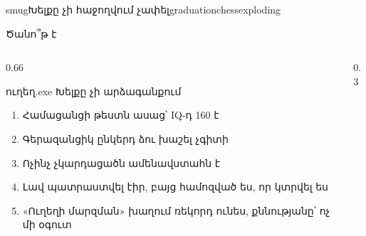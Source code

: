 
%
  {    }%
  {smug}{Խելքը չի հաջողվում չափել}{{graduation}{chess}{exploding}}

\begin{frame}{Ծանո՞թ է}
  \begin{columns}[c]
    \begin{column}{0.66\textwidth}
      \begin{popup}{ուղեղ.exe}
        {\blackfont Խելքը չի արձագանքում}\par\smallskip
        \begin{enumerate}\small
          \item<2-> Համացանցի թեստն ասաց՝ IQ-դ 160 է
          \item<3-> Գերազանցիկ ընկերդ ձու խաշել չգիտի
          \item<4-> Ոչինչ չկարդացածն ամենավստահն է
          \item<5-> Լավ պատրաստվել էիր, բայց համոզված ես, որ կտրվել ես
          \item<6-> «Ուղեղի մարզման» խաղում ռեկորդ ունես, քննությանը՝ ոչ մի օգուտ
        \end{enumerate}
      \end{popup}
    \end{column}
    \begin{column}{0.3\textwidth}
      \centering
      \par\medskip
    \end{column}
  \end{columns}
\end{frame}

